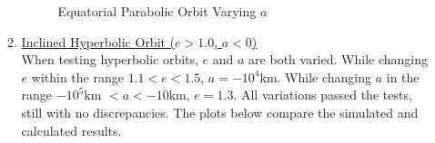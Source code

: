 \begin{itemize}
\begin{enumerate}
		\begin{figure}[H]
			\centering
			\caption{Equatorial Parabolic Orbit Varying $a$}\label{fig:9}
		\end{figure}
		\pagebreak
		\item \underline{Inclined Hyperbolic Orbit ($e>1.0$, \quad $a<0$)}\\
		When testing hyperbolic orbits, $e$ and $a$ are both varied. While changing $e$ within the range $1.1<e<1.5$, $a=-10^4$km. While changing $a$ in the range $-10^5$km $<a < -10$km, $e=1.3$. All variations passed the tests, still with no discrepancies. The plots below compare the simulated and calculated results.
		\begin{figure}[H] \label{fig:10}
			\centering

\end{figure}
\end{enumerate}
\end{itemize}
